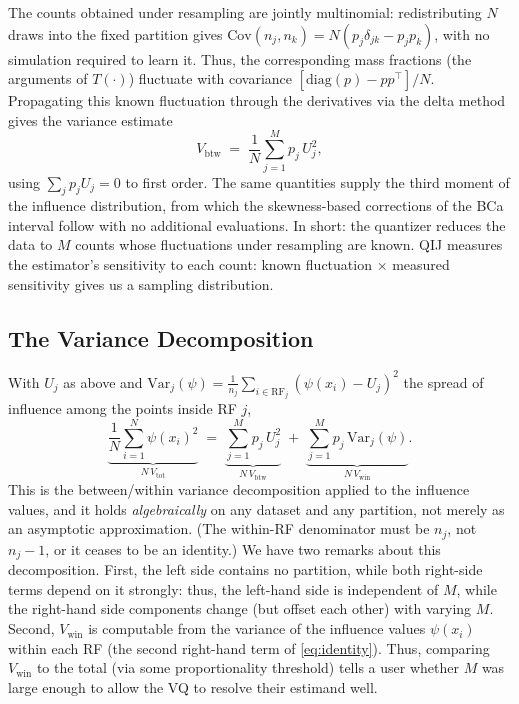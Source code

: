 \documentclass[runningheads]{llncs}
\newcommand{\ifl}{\psi}
\newcommand{\Vcell}{V_{\mathrm{btw}}}
\newcommand{\Vwithin}{V_{\mathrm{win}}}
\newcommand{\Vtotal}{V_{\mathrm{tot}}}
\begin{document}
The counts obtained under resampling are jointly multinomial: redistributing $N$ draws into the fixed partition gives $\mathrm{Cov}(n_j, n_k) = N(p_j \delta_{jk} - p_j p_k)$, with no simulation required to learn it. Thus, the corresponding mass fractions (the arguments of $T(\cdot)$) fluctuate with covariance $[\mathrm{diag}(p) - pp^{\top}]/N$. Propagating this known fluctuation through the derivatives via the delta method gives the variance estimate
\begin{equation}\label{eq:Vcell}
\Vcell \;=\; \frac1N \sum_{j=1}^{M} p_j\, U_j^{2},
\end{equation}
using $\sum_j p_j U_j = 0$ to first order. The same quantities supply the third moment of the influence distribution, from which the skewness-based corrections of the BCa interval \cite{efron1987} follow with no additional evaluations. In short: the quantizer reduces the data to $M$ counts whose fluctuations under resampling are known. QIJ measures the estimator's sensitivity to each count: known fluctuation $\times$ measured sensitivity gives us a sampling distribution.

\subsection{The Variance Decomposition}\label{sec:identity}

With $U_j$ as above and $\mathrm{Var}_j(\ifl) = \tfrac{1}{n_j}\sum_{i \in \mathrm{RF}_j}(\ifl(x_i) - U_j)^2$ the spread of influence among the points inside RF $j$,
\begin{equation}\label{eq:identity}
\underbrace{\frac1N\sum_{i=1}^{N} \ifl(x_i)^{2}}_{N\,\Vtotal}
\;=\;
\underbrace{\sum_{j=1}^{M} p_j\, U_j^{2}}_{N\,\Vcell}
\;+\;
\underbrace{\sum_{j=1}^{M} p_j\, \mathrm{Var}_j(\ifl)}_{N\,\Vwithin}.
\end{equation}
This is the between/within variance decomposition applied to the influence values, and it holds \emph{algebraically} on any dataset and any partition, not merely as an asymptotic approximation. (The within-RF denominator must be $n_j$, not $n_j{-}1$, or it ceases to be an identity.) We have two remarks about this decomposition. First, the left side contains no partition, while both right-side terms depend on it strongly: thus, the left-hand side is independent of $M$, while the right-hand side components change (but offset each other) with varying $M$. Second, $\Vwithin$ is computable from the variance of the influence values $\ifl(x_i)$ within each RF (the second right-hand term of \eqref{eq:identity}). Thus, comparing $\Vwithin$ to the total (via some proportionality threshold) tells a user whether $M$ was large enough to allow the VQ to resolve their estimand well.
\end{document}
